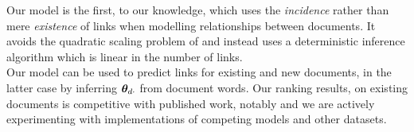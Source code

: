 Our model is the first, to our knowledge, which uses the \emph{incidence} rather than mere \emph{existence} of links when modelling relationships between documents. It avoids the quadratic scaling problem of \cite{Chang2009a} and instead uses a deterministic inference algorithm which is linear in the number of links.\\

Our model can be used to predict links for existing and new documents, in the latter case by inferring ${ \bm \theta_{d\cdot} }$ from document words. Our ranking results, on existing documents is competitive with published work, notably \cite{Chang2009a}\cite{Neiswanger2014} and we are actively experimenting with implementations of competing models and other datasets.



